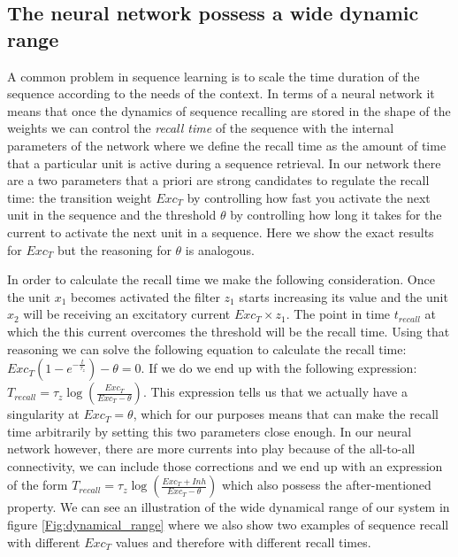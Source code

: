 \documentclass{esannV2}
\begin{document}
\subsection{The neural network possess a wide dynamic range}

A common problem in sequence learning is to scale the time duration of the sequence according to the needs of the context. In terms of a neural network it means that once the dynamics of sequence recalling are stored in the shape of the weights we can control the \textit{recall time} of the sequence with the internal parameters of the network where we define the recall time as the amount of time that a particular unit is active during a sequence retrieval. In our network there are a two parameters that a priori are strong candidates to regulate the recall time: the transition weight $Exc_T$ by controlling how fast you activate the next unit in the sequence and the threshold $\theta$ by controlling how long it takes for the current to activate the next unit in a sequence. Here we show the exact results for $Exc_T$ but the reasoning for $\theta$ is analogous.  

In order to calculate the recall time we make the following consideration. Once the unit $x_1$ becomes activated the filter $z_1$ starts increasing its value and the unit $x_2$ will be receiving an excitatory current $Exc_T \times z_1$. The point in time $t_{recall}$ at which the this current overcomes the threshold will be the recall time. Using that reasoning we can solve the following equation to calculate the recall time: $Exc_{T}(1 - e^{-\frac{t}{\tau_z}}) - \theta = 0$. If we do we end up with the following expression: $T_{recall} = \tau_z \log(\frac{Exc_T}{Exc_T - \theta})$. This expression tells us that we actually have a singularity at $Exc_T = \theta$, which for our purposes means that can make the recall time arbitrarily by setting this two parameters close enough. In our neural network however, there are more currents into play because of the all-to-all connectivity, we can include those corrections and we end up with an expression of the form $T_{recall} = \tau_z \log(\frac{Exc_T + Inh}{Exc_T - \theta})$ which also possess the after-mentioned property. We can see an illustration of the wide dynamical range of our system in figure \ref{Fig:dynamical_range} where we also show two examples of sequence recall with different $Exc_T$ values and therefore with different recall times. 
\end{document}
